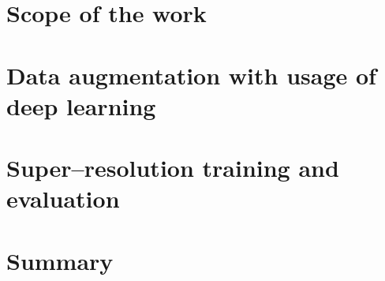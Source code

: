 \documentclass[a4paper, openright, twoside, 12pt]{report}
\begin{document}
\chapter{Scope of the work}


\chapter{Data augmentation with usage of deep learning}


\chapter{Super--resolution training and evaluation}


\chapter{Summary}


\begin{appendices}
    
\end{appendices}

\listoffigures
\listoftables
\listofalgorithms
\listoflistings

\nocite{*}


\end{document}
